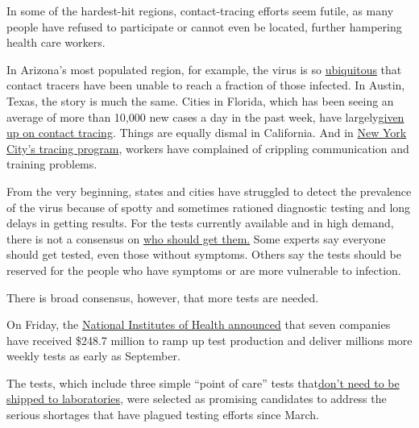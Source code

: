 In some of the hardest-hit regions, contact-tracing efforts seem futile,
as many people have refused to participate or cannot even be located,
further hampering health care workers.

In Arizona's most populated region, for example, the virus is so
\href{https://www.azfamily.com/news/continuing_coverage/coronavirus_coverage/contact-tracing-important-but-less-useful-with-spiking-cases-maricopa-county-says/article_57d55328-bb4b-11ea-8718-8b1cf4ab4137.html}{ubiquitous}
that contact tracers have been unable to reach a fraction of those
infected. In Austin, Texas, the story is much the same. Cities in
Florida, which has been seeing an average of more than 10,000 new cases
a day in the past week, have
largely\href{https://www.nbcmiami.com/news/local/miami-beach-mayor-urges-desantis-to-address-failures-of-floridas-contact-tracing-program/2268324/}{given
up on contact tracing}. Things are equally dismal in California. And in
\href{https://www.nytimes.com/2020/07/29/nyregion/new-york-contact-tracing.html}{New
York City's tracing program}, workers have complained of crippling
communication and training problems.

From the very beginning, states and cities have struggled to detect the
prevalence of the virus because of spotty and sometimes rationed
diagnostic testing and long delays in getting results. For the tests
currently available and in high demand, there is not a consensus on
\href{https://www.nytimes.com/2020/07/31/health/coronavirus-test-ethics.html}{who
should get them.} Some experts say everyone should get tested, even
those without symptoms. Others say the tests should be reserved for the
people who have symptoms or are more vulnerable to infection.

There is broad consensus, however, that more tests are needed.

On Friday, the
\href{https://www.nih.gov/news-events/news-releases/nih-delivering-new-covid-19-testing-technologies-meet-us-demand}{National
Institutes of Health announced} that seven companies have received
\$248.7 million to ramp up test production and deliver millions more
weekly tests as early as September.

The tests, which include three simple ``point of care'' tests
that\href{https://www.nytimes.com/2020/07/06/health/fast-coronavirus-tests.html}{don't
need to be shipped to laboratories}, were selected as promising
candidates to address the serious shortages that have plagued testing
efforts since March.

